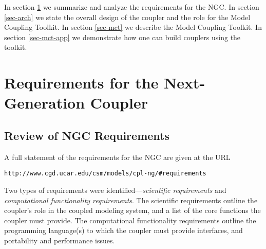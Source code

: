 \documentclass{article}
\begin{document}
In section \ref{sec-req} we summarize and analyze the requirements
for the NGC.  In section \ref{sec-arch} we
state the overall design of the coupler and the role for
the Model Coupling Toolkit.  In section \ref{sec-mct} we
describe the Model Coupling Toolkit.  In section
\ref{sec-mct-app} we demonstrate how one can build couplers using
the toolkit.

\section{Requirements for the Next-Generation Coupler}\label{sec-req}

\subsection{Review of NGC Requirements}

A full statement of the requirements for the NGC are given at the
URL
\begin{verbatim}
http://www.cgd.ucar.edu/csm/models/cpl-ng/#requirements
\end{verbatim}

Two types of requirements were identified---{\em scientific
requirements} and {\em computational functionality requirements}.
The scientific requirements outline the coupler's role in the
coupled modeling system, and a list of the core functions the
coupler must provide.  The computational functionality
requirements outline the programming language(s) to which the
coupler must provide interfaces, and portability and performance
issues.
\end{document}
